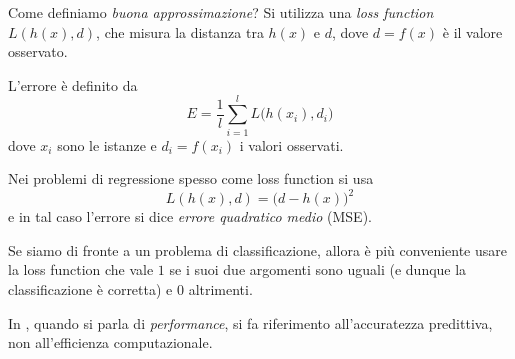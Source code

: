 Come definiamo \emph{buona approssimazione}? Si utilizza una \emph{loss function} $L(h(x),d)$, che misura la distanza tra $h(x)$ e $d$, dove $d=f(x)$ è il valore osservato.

\begin{definition}[Errore]
L'errore è definito da
\begin{equation}
E=\frac 1l\sum_{i=1}^{l}L\big(h(x_i),d_i\big)
\end{equation}
dove $x_i$ sono le istanze e $d_i=f(x_i)$ i valori osservati.
\end{definition}

\begin{example}
Nei problemi di regressione spesso come loss function si usa \begin{equation}
L(h(x),d)=\big(d-h(x)\big)^2
\end{equation}
e in tal caso l'errore si dice \emph{errore quadratico medio} (MSE).

Se siamo di fronte a un problema di classificazione, allora è più conveniente usare la loss function che vale $1$ se i suoi due argomenti sono uguali (e dunque la classificazione è corretta) e $0$ altrimenti.
\end{example}

\begin{remark}
In \ml, quando si parla di \emph{performance}, si fa riferimento all'accuratezza predittiva, non all'efficienza computazionale.
\end{remark}